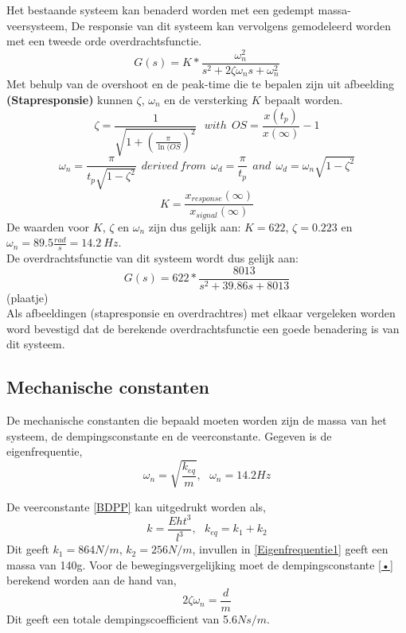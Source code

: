 \documentclass[a4paper]{article}
\begin{document}
Het bestaande systeem kan benaderd worden met een gedempt massa-veersysteem, De responsie van dit systeem kan vervolgens gemodeleerd worden met een tweede orde overdrachtsfunctie. 
\begin{equation}
G(s) = K * \frac{\omega_n^2}{s^2 + 2 \zeta \omega_n s + \omega_n^2}
\end{equation}
Met behulp van de overshoot en de peak-time die te bepalen zijn uit afbeelding \textbf{(Stapresponsie)} kunnen $\zeta$, $\omega_n$ en de versterking $K$ bepaalt worden.
\begin{equation}
\zeta = \frac{1}{\sqrt{1 + (\frac{\pi}{\ln(OS})^2}} \ \ \ with \ \ OS = \frac{x(t_p)}{x(\infty)} -1
\end{equation}
\begin{equation}
\omega_n = \frac{\pi}{t_p \sqrt{1 - \zeta^2}} \ \ derived \ from \ \ \omega_d = \frac{\pi}{t_p} \ \ and \ \ \omega_d = \omega_n \sqrt{1-\zeta^2}
\end{equation}
\begin{equation}
K = \frac{x_{response}(\infty)}{x_{signal}(\infty)}
\end{equation}
De waarden voor $K$, $\zeta$ en $\omega_n$ zijn dus gelijk aan: $ K = 622$, 
$\zeta = 0.223$ en $\omega_n = 89.5 \frac{rad}{s} = 14.2 \ Hz$.\\
De overdrachtsfunctie van dit systeem wordt dus gelijk aan:
\begin{equation}
G(s) = 622 * \frac{8013}{s^2 + 39.86 s + 8013}
\end{equation}
(plaatje) \\
Als afbeeldingen (stapresponsie en overdrachtres) met elkaar vergeleken worden word bevestigd dat de berekende overdrachtsfunctie een goede benadering is van dit systeem. 

\subsection{Mechanische constanten}

De mechanische constanten die bepaald moeten worden zijn de massa van het systeem, de dempingsconstante en de veerconstante. Gegeven is de eigenfrequentie,\\ 

\begin{equation}
\omega_n=\sqrt{\frac{k_{eq}}{m}}, \ \ \ \omega_n=14.2Hz
\label{Eigenfrequentie1}
\end{equation}

De veerconstante \ref{BDPP} kan uitgedrukt worden als,
\begin{equation}
k=\frac{Eht^3}{l^3}, \ \ \ k_{eq}=k_1+k_2
\label{Veerstijfheid} 
\end{equation} 
Dit geeft $k_1=864$$N/m$, $k_2=256$$N/m$, invullen in \ref{Eigenfrequentie1} geeft een massa van 140g. Voor de bewegingsvergelijking moet de dempingsconstante \ref{•} berekend worden aan de hand van,
\begin{equation}
2\zeta\omega_n=\frac{d}{m}
\end{equation} 
Dit geeft een totale dempingscoefficient van 5.6$Ns/m$.\\
\end{document}
